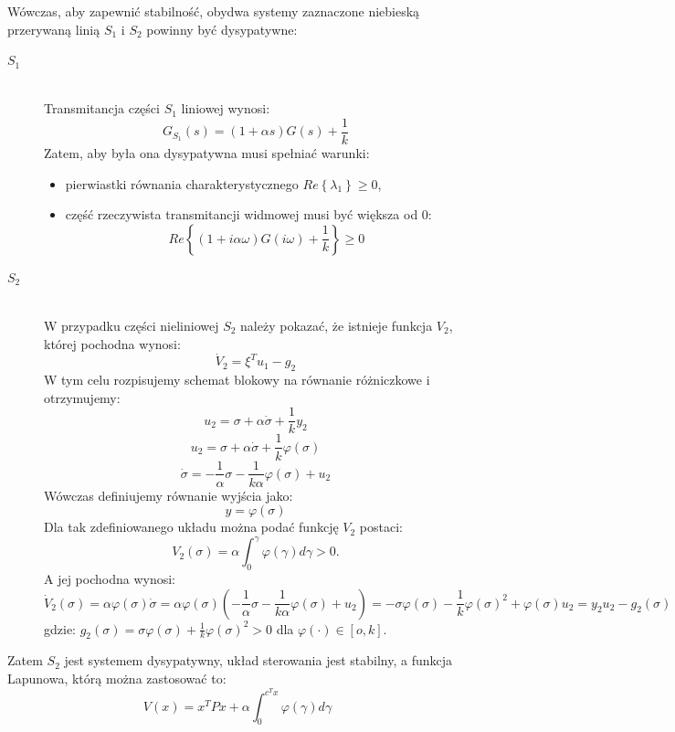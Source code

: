 \documentclass{article}
\begin{document}
    Wówczas, aby zapewnić stabilność, obydwa systemy zaznaczone niebieską przerywaną linią $S_{1}$ i $S_{2}$ powinny być dysypatywne:
    \begin{description}
      \item[$S_{1}$] \hfill \\
        Transmitancja części $S_{1}$ liniowej wynosi:
        $$
            G_{S_{1}}(s) = (1+\alpha s)G(s) + \frac{1}{k}
        $$
        Zatem, aby była ona dysypatywna musi spełniać warunki:
        \begin{itemize}
            \item pierwiastki równania charakterystycznego $Re\left\{\lambda_{1}\right\} \geq 0$,
            \item część rzeczywista transmitancji widmowej musi być większa od $0$:
            $$
                Re\left\{ (1+ i\alpha\omega )G(i\omega) + \frac{1}{k} \right\} \geq 0
            $$
        \end{itemize}
      \item[$S_{2}$] \hfill \\ 
      W przypadku części nieliniowej $S_{2}$ należy pokazać, że istnieje funkcja $V_{2}$, której pochodna wynosi:
      $$
        \dot{V}_{2} = \xi ^{T}u_{1} - g_{2}
      $$
      W tym celu rozpisujemy schemat blokowy na równanie różniczkowe i otrzymujemy:
      $$
        u_{2} = \sigma + \alpha\dot{\sigma} + \frac{1}{k}y_{2}
      $$
      $$
        u_{2} = \sigma + \alpha\dot{\sigma} + \frac{1}{k}\varphi(\sigma)
      $$
      $$
        \dot{\sigma} = -\frac{1}{\alpha}\sigma - \frac{1}{k\alpha}\varphi(\sigma) + u_{2}
      $$
      Wówczas definiujemy równanie wyjścia jako:
      $$
        y = \varphi(\sigma)
      $$
      Dla tak zdefiniowanego układu można podać funkcję $V_{2}$ postaci:
      $$
        V_{2}(\sigma) = \alpha\int_{0}^{\gamma}{\varphi(\gamma)d\gamma} > 0.
      $$
      A jej pochodna wynosi:
      $$
        \dot{V}_{2}(\sigma)
        =
        \alpha\varphi(\sigma)\dot{\sigma}
        =
        \alpha\varphi(\sigma) \left( -\frac{1}{\alpha}\sigma - \frac{1}{k\alpha}\varphi(\sigma) + u_{2} \right)
        =
        -\sigma\varphi(\sigma) - \frac{1}{k}\varphi(\sigma)^{2} + \varphi(\sigma)u_{2}
        =
        y_{2}u_{2} - g_{2}(\sigma)
      $$
      gdzie: $g_{2}(\sigma) = \sigma\varphi(\sigma) + \frac{1}{k}\varphi(\sigma)^{2} > 0$ dla $\varphi(\cdot) \in [o, k]$.
    \end{description}
    Zatem $S_{2}$ jest systemem dysypatywny, układ sterowania jest stabilny, a funkcja Lapunowa, którą można zastosować to:
    $$
        V(x) = x^{T}Px + \alpha\int_{0}^{c^{T}x}{\varphi(\gamma)d\gamma}
    $$
\end{document}
